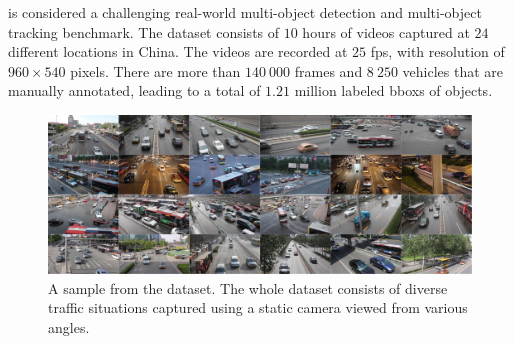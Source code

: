 \uadetrac{} is considered a challenging real-world multi-object detection and multi-object tracking benchmark. The dataset consists of $10$ hours of videos captured at $24$ different locations in China. The videos are recorded at $25$ \gls{fps}, with resolution of $960 \times 540$ pixels. There are more than $140\ 000$ frames and $8\ 250$ vehicles that are manually annotated, leading to a total of $1.21$ million labeled \glspl{bbox} of objects.

\begin{figure}[t]
    \centerline{\includegraphics[width=\linewidth]{figures/datasets/uadetrac_samples.jpg}}
    \caption[\uadetrac{} dataset]{A sample from the \uadetrac{} dataset. The whole dataset consists of diverse traffic situations captured using a static camera viewed from various angles. }
    \label{fig:DatasetUADETRAC}
\end{figure}

\def\uadetracfigsize{0.4}

